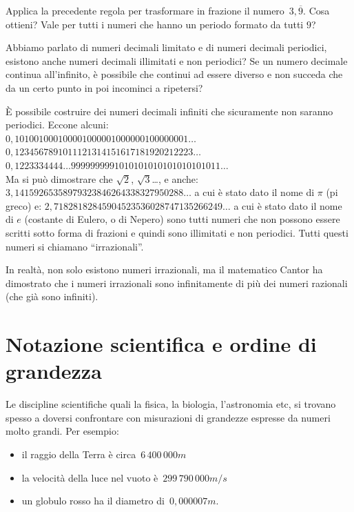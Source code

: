 \begin{osservazione}{}{}
 Applica la precedente regola per trasformare in frazione il 
 numero~\(3,\overline{9}\). Cosa ottieni? 
 Vale per tutti i numeri che hanno un periodo formato da tutti \(9\)?
\end{osservazione}

Abbiamo parlato di numeri decimali limitato e di numeri decimali 
periodici, esistono anche numeri decimali illimitati e non periodici?
Se un numero decimale continua all'infinito, è possibile che continui ad 
essere diverso e non succeda che da un certo punto in poi incominci a 
ripetersi?

È possibile costruire dei numeri decimali infiniti che sicuramente non 
saranno periodici. Eccone alcuni:\\
\(0,101001000100001000001000000100000001\dots\)\\
\(0,1234567891011121314151617181920212223\dots\)\\
\(0,1223334444\dots9999999991010101010101010101011\dots\)\\
Ma si può dimostrare che \(\sqrt{2}\), \(\sqrt{3}\)\dots, 
e anche: 
\(3,14159265358979323846264338327950288\dots\) 
a cui è stato dato il nome di \(\pi\) (pi greco) e:
\(2,71828182845904523536028747135266249\dots\)
a cui è stato dato il nome di \(e\) (costante di Eulero, o di Nepero) sono 
tutti numeri che non possono essere scritti sotto forma di frazioni e quindi 
sono illimitati e non periodici.
Tutti questi numeri si chiamano ``irrazionali''.

\begin{osservazione}{}{}
In realtà, non solo esistono numeri irrazionali, ma il matematico Cantor ha 
dimostrato che i numeri irrazionali sono infinitamente di più dei numeri 
razionali (che già sono infiniti).
\end{osservazione}

\section{Notazione scientifica e ordine di grandezza}
\label{sec:razionali_notazione_scientifica}

Le discipline scientifiche quali la fisica, la biologia, l'astronomia etc,
si trovano spesso a doversi confrontare con misurazioni di grandezze 
espresse 
da numeri molto grandi. Per esempio:

\begin{itemize} [noitemsep]
\item il raggio della Terra è circa~\(6\,400\,000\unit{m}\)
\item la velocità della luce nel vuoto è~\(299\,790\,000\unit{m/s}\)
\item un globulo rosso ha il diametro di~\(0,000007\unit{m}\).
\end{itemize}

